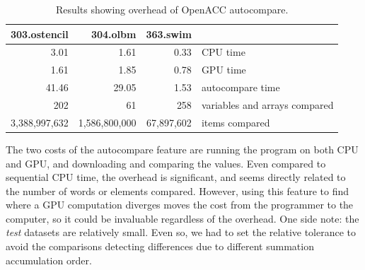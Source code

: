 \begin{table}
\begin{center}
\begin{tabular}{rrrl}
\hline
303.ostencil & 304.olbm & 363.swim & \\
\hline
 3.01 &  1.61 & 0.33 & CPU time \\
 1.61 &  1.85 & 0.78 & GPU time\\
41.46 & 29.05 & 1.53 & autocompare time \\
202 & 61 & 258 & variables and arrays compared \\
3,388,997,632 & 1,586,800,000 & 67,897,602 & items compared \\
\hline
\end{tabular}
\end{center}
\caption{Results showing overhead of OpenACC autocompare.}
\label{res1}
\end{table}

The two costs of the autocompare feature are running the program on both CPU and GPU, and downloading and comparing the values.
Even compared to sequential CPU time, the overhead is significant, and seems directly related to the number of words or elements compared.
However, using this feature to find where a GPU computation diverges moves the cost from the programmer to the computer, so it could be invaluable regardless of the overhead.
One side note: the \emph{test} datasets are relatively small.
Even so, we had to set the relative tolerance to avoid the comparisons detecting differences due to different summation accumulation order.
